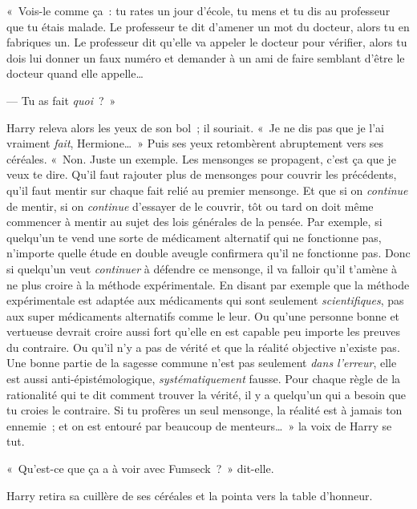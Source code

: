 «~Vois-le comme ça~: tu rates un jour d'école, tu mens et tu dis au professeur que tu étais malade. Le professeur te dit d'amener un mot du docteur, alors tu en fabriques un. Le professeur dit qu'elle va appeler le docteur pour vérifier, alors tu dois lui donner un faux numéro et demander à un ami de faire semblant d'être le docteur quand elle appelle…

--- Tu as fait \emph{quoi}~?~»

Harry releva alors les yeux de son bol~; il souriait. «~Je ne dis pas que je l'ai vraiment \emph{fait}, Hermione…~» Puis ses yeux retombèrent abruptement vers ses céréales. «~Non. Juste un exemple. Les mensonges se propagent, c'est ça que je veux te dire. Qu'il faut rajouter plus de mensonges pour couvrir les précédents, qu'il faut mentir sur chaque fait relié au premier mensonge. Et que si on \emph{continue} de mentir, si on \emph{continue} d'essayer de le couvrir, tôt ou tard on doit même commencer à mentir au sujet des lois générales de la pensée. Par exemple, si quelqu'un te vend une sorte de médicament alternatif qui ne fonctionne pas, n'importe quelle étude en double aveugle confirmera qu'il ne fonctionne pas. Donc si quelqu'un veut \emph{continuer} à défendre ce mensonge, il va falloir qu'il t'amène à ne plus croire à la méthode expérimentale. En disant par exemple que la méthode expérimentale est adaptée aux médicaments qui sont seulement \emph{scientifiques}, pas aux super médicaments alternatifs comme le leur. Ou qu'une personne bonne et vertueuse devrait croire aussi fort qu'elle en est capable peu importe les preuves du contraire. Ou qu'il n'y a pas de vérité et que la réalité objective n'existe pas. Une bonne partie de la sagesse commune n'est pas seulement \emph{dans l'erreur}, elle est aussi anti-épistémologique, \emph{systématiquement} fausse. Pour chaque règle de la rationalité qui te dit comment trouver la vérité, il y a quelqu'un qui a besoin que tu croies le contraire. Si tu profères un seul mensonge, la réalité est à jamais ton ennemie~; et on est entouré par beaucoup de menteurs…~» la voix de Harry se tut.

«~Qu'est-ce que ça a à voir avec Fumseck~?~» dit-elle.

Harry retira sa cuillère de ses céréales et la pointa vers la table d'honneur.

